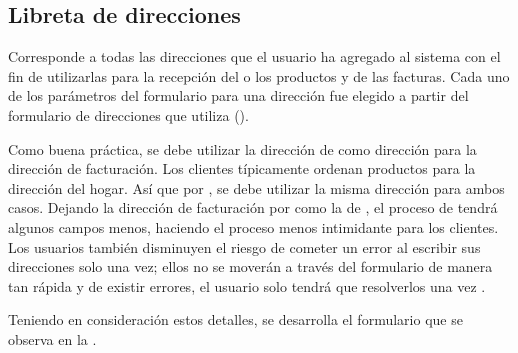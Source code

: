 	\subsection{Libreta de direcciones}\label{chapter:solucionimplementada:section:profile:subsection:book_address}

		Corresponde a todas las direcciones que el usuario ha agregado al sistema con el fin de utilizarlas para la recepción del o los productos y de las facturas. Cada uno de los parámetros del formulario para una dirección fue elegido a partir del formulario de direcciones que utiliza \amazonNAME ().

		Como buena práctica, se debe utilizar la dirección de \ShippingCOM como dirección  para la dirección de facturación. Los clientes típicamente ordenan productos para la dirección del hogar. Así que por , se debe utilizar la misma dirección para ambos casos\cite{online_official_smashingmagazine_fundamental_guidelines_checkout_design}.
		Dejando la dirección de facturación por  como la de \ShippingCOM, el proceso de \checkoutCOM tendrá algunos campos menos, haciendo el proceso menos intimidante para los clientes. Los usuarios también disminuyen el riesgo de cometer un error al escribir sus direcciones solo una vez; ellos no se moverán a través del formulario de manera tan rápida y de existir errores, el usuario solo tendrá que resolverlos una vez \cite{online_official_smashingmagazine_fundamental_guidelines_checkout_design}.

		Teniendo en consideración estos detalles, se desarrolla el formulario que se observa en la .

